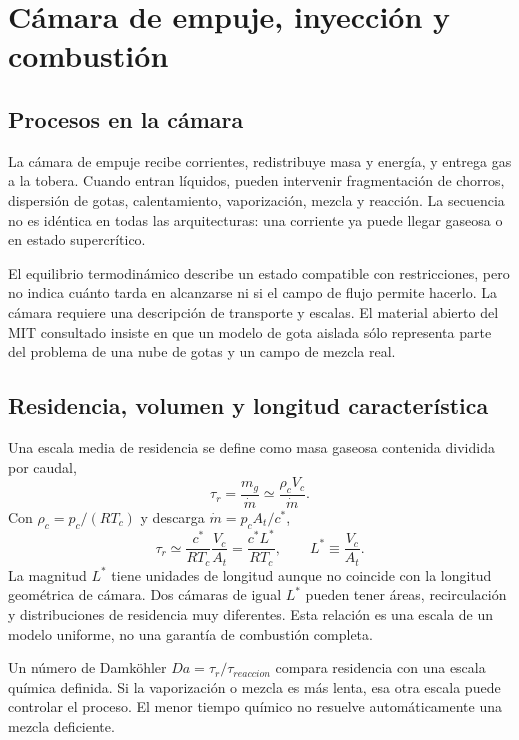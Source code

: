 \chapter{Cámara de empuje, inyección y combustión}\label{ch:16}
\section{Procesos en la cámara}
La cámara de empuje recibe corrientes, redistribuye masa y energía, y entrega gas a la tobera. Cuando entran líquidos, pueden intervenir fragmentación de chorros, dispersión de gotas, calentamiento, vaporización, mezcla y reacción. La secuencia no es idéntica en todas las arquitecturas: una corriente ya puede llegar gaseosa o en estado supercrítico.

El equilibrio termodinámico describe un estado compatible con restricciones, pero no indica cuánto tarda en alcanzarse ni si el campo de flujo permite hacerlo. La cámara requiere una descripción de transporte y escalas. El material abierto del MIT consultado insiste en que un modelo de gota aislada sólo representa parte del problema de una nube de gotas y un campo de mezcla real.\cite{MIT20,MIT21}
\section{Residencia, volumen y longitud característica}
Una escala media de residencia se define como masa gaseosa contenida dividida por caudal,
\[
 \tau_r=\frac{m_g}{\dot m}\simeq\frac{\rho_cV_c}{\dot m}.
\]
Con $\rho_c=p_c/(RT_c)$ y descarga $\dot m=p_cA_t/c^*$,
\begin{equation}
 \tau_r\simeq\frac{c^*}{RT_c}\frac{V_c}{A_t}
 =\frac{c^*L^*}{RT_c},\qquad L^*\equiv\frac{V_c}{A_t}.
\end{equation}
La magnitud $L^*$ tiene unidades de longitud aunque no coincide con la longitud geométrica de cámara. Dos cámaras de igual $L^*$ pueden tener áreas, recirculación y distribuciones de residencia muy diferentes. Esta relación es una escala de un modelo uniforme, no una garantía de combustión completa.

Un número de Damköhler $Da=\tau_r/\tau_{reaccion}$ compara residencia con una escala química definida. Si la vaporización o mezcla es más lenta, esa otra escala puede controlar el proceso. El menor tiempo químico no resuelve automáticamente una mezcla deficiente.
